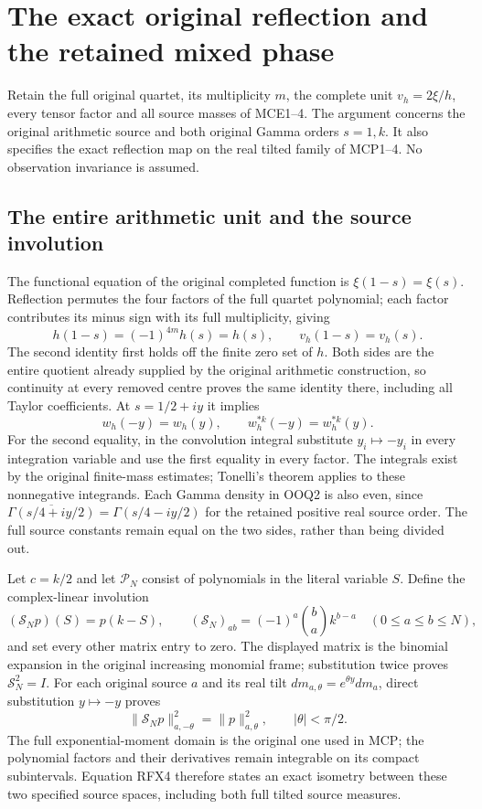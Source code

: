 \documentclass[11pt,a4paper]{article}
\begin{document}

\clearpage
\section{The exact original reflection and the retained mixed phase}
\label{sec:RFX}
Retain the full original quartet, its multiplicity $m$, the complete
unit $v_h=2\xi/h$, every tensor factor and all source masses of
MCE1--4. The argument concerns the original arithmetic source and
both original Gamma orders $s=1,k$. It also specifies the exact
reflection map on the real tilted family of MCP1--4. No observation
invariance is assumed.

\subsection{The entire arithmetic unit and the source involution}
The functional equation of the original completed function is
$\xi(1-s)=\xi(s)$. Reflection permutes the four factors of the
full quartet polynomial; each factor contributes its minus sign
with its full multiplicity, giving
\[
 h(1-s)=(-1)^{4m}h(s)=h(s),\qquad v_h(1-s)=v_h(s).
 \tag{RFX1}
\]
The second identity first holds off the finite zero set of $h$.
Both sides are the entire quotient already supplied by the original
arithmetic construction, so continuity at every removed centre proves
the same identity there, including all Taylor coefficients. At
$s=1/2+iy$ it implies
\[
 w_h(-y)=w_h(y),\qquad w_h^{*k}(-y)=w_h^{*k}(y).
 \tag{RFX2}
\]
For the second equality, in the convolution integral substitute
$y_i\mapsto-y_i$ in every integration variable and use the first
equality in every factor. The integrals exist by the original
finite-mass estimates; Tonelli's theorem applies to these nonnegative
integrands. Each Gamma density in OOQ2 is also even, since
$\overline{\Gamma(s/4+iy/2)}=\Gamma(s/4-iy/2)$ for the retained
positive real source order. The full source constants remain equal
on the two sides, rather than being divided out.

Let $c=k/2$ and let $\mathcal P_N$ consist of polynomials in the
literal variable $S$. Define the complex-linear involution
\[
 (\mathscr S_Np)(S)=p(k-S),\qquad
 (\mathscr S_N)_{ab}=(-1)^a\binom ba k^{b-a}
 \quad(0\le a\le b\le N),
 \tag{RFX3}
\]
and set every other matrix entry to zero. The displayed matrix is
the binomial expansion in the original increasing monomial frame;
substitution twice proves $\mathscr S_N^2=I$. For each original
source $a$ and its real tilt $dm_{a,\theta}=e^{\theta y}dm_a$, direct
substitution $y\mapsto-y$ proves
\[
 \|\mathscr S_Np\|_{a,-\theta}^2=\|p\|_{a,\theta}^2,
 \qquad |\theta|<\pi/2.
 \tag{RFX4}
\]
The full exponential-moment domain is the original one used in MCP;
the polynomial factors and their derivatives remain integrable on
its compact subintervals. Equation RFX4 therefore states an exact
isometry between these two specified source spaces, including both
full tilted source measures.
\end{document}
